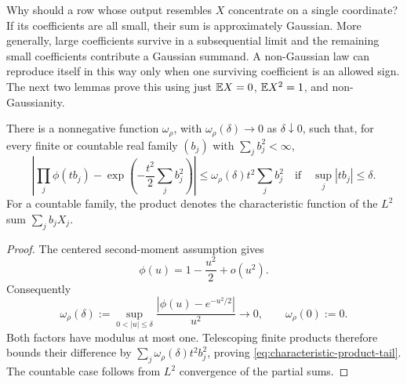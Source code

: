 Why should a row whose output resembles \(X\) concentrate on a single
coordinate? If its coefficients are all small, their sum is approximately
Gaussian. More generally, large coefficients survive in a subsequential
limit and the remaining small coefficients contribute a Gaussian summand.
A non-Gaussian law can reproduce itself in this way only when one surviving
coefficient is an allowed sign. The next two lemmas prove this using just
\(\mathbb E X=0\), \(\mathbb E X^2=1\), and non-Gaussianity.

\begin{lemma}
\label{lem:characteristic-product-tail}
There is a nonnegative function $\omega_\rho$, with
$\omega_\rho(\delta)\to0$ as
$\delta\downarrow0$, such that, for every finite or countable real family
$(b_j)$ with $\sum_j b_j^2<\infty$,
\begin{equation}
 \left|\prod_j\phi(tb_j)
       -\exp\!\left(-\frac{t^2}{2}\sum_jb_j^2\right)\right|
 \leq \omega_\rho(\delta)t^2\sum_jb_j^2
 \quad\text{if}\quad \sup_j|tb_j|\leq\delta.
 \label{eq:characteristic-product-tail}
\end{equation}
For a countable family, the product denotes the characteristic function
of the $L^2$ sum $\sum_jb_jX_j$.
\end{lemma}
\begin{proof}
The centered second-moment assumption gives
\[
 \phi(u)=1-\frac{u^2}{2}+o(u^2).
\]
Consequently
\[
 \omega_\rho(\delta):=
 \sup_{0<|u|\leq\delta}
 \frac{|\phi(u)-e^{-u^2/2}|}{u^2}
 \longrightarrow0,\qquad \omega_\rho(0):=0.
\]
Both factors have modulus at most one.  Telescoping finite products therefore
bounds their difference by
$\sum_j\omega_\rho(\delta)t^2b_j^2$, proving
\eqref{eq:characteristic-product-tail}.  The countable case follows from
$L^2$ convergence of the partial sums.
\end{proof}

